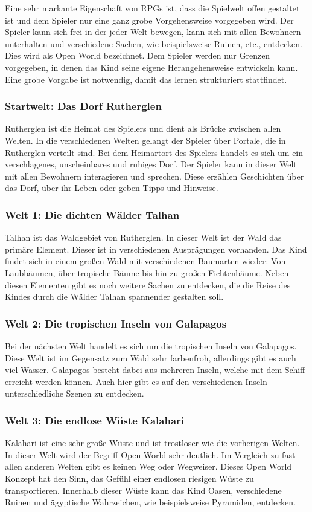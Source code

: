 Eine sehr markante Eigenschaft von \acp{RPG} ist, dass die Spielwelt offen gestaltet ist und dem Spieler nur eine ganz grobe Vorgehensweise vorgegeben wird. Der Spieler kann sich frei in der jeder Welt bewegen, kann sich mit allen Bewohnern unterhalten und verschiedene Sachen, wie beispielsweise Ruinen, etc., entdecken. Dies wird als Open World bezeichnet. Dem Spieler werden nur Grenzen vorgegeben, in denen das Kind seine eigene Herangehensweise entwickeln kann. Eine grobe Vorgabe ist notwendig, damit das lernen strukturiert stattfindet.

\subsubsection{Startwelt: Das Dorf Rutherglen}
	Rutherglen ist die Heimat des Spielers und dient als Brücke zwischen allen Welten. In die verschiedenen Welten gelangt der Spieler über Portale, die in Rutherglen verteilt sind. Bei dem Heimartort des Spielers handelt es sich um ein verschlagenes, unscheinbares und ruhiges Dorf. Der Spieler kann in dieser Welt mit allen Bewohnern interagieren und sprechen. Diese erzählen Geschichten über das Dorf, über ihr Leben oder geben Tipps und Hinweise.
	
\subsubsection{Welt 1: Die dichten Wälder Talhan}
	Talhan ist das Waldgebiet von Rutherglen. In dieser Welt ist der Wald das primäre Element. Dieser ist in verschiedenen Ausprägungen vorhanden. Das Kind findet sich in einem großen Wald mit verschiedenen Baumarten wieder: Von Laubbäumen, über tropische Bäume bis hin zu großen Fichtenbäume. Neben diesen Elementen gibt es noch weitere Sachen zu entdecken, die die Reise des Kindes durch die Wälder Talhan spannender gestalten soll.
	
\subsubsection{Welt 2: Die tropischen Inseln von Galapagos}
	Bei der nächsten Welt handelt es sich um die tropischen Inseln von Galapagos. Diese Welt ist im Gegensatz zum Wald sehr farbenfroh, allerdings gibt es auch viel Wasser. Galapagos besteht dabei aus mehreren Inseln, welche mit dem Schiff erreicht werden können. Auch hier gibt es auf den verschiedenen Inseln unterschiedliche Szenen zu entdecken.
	
\subsubsection{Welt 3: Die endlose Wüste Kalahari}
	Kalahari ist eine sehr große Wüste und ist trostloser wie die vorherigen Welten. In dieser Welt wird der Begriff Open World sehr deutlich. Im Vergleich zu fast allen anderen Welten gibt es keinen Weg oder Wegweiser. Dieses Open World Konzept hat den Sinn, das Gefühl einer endlosen riesigen Wüste zu transportieren. Innerhalb dieser Wüste kann das Kind Oasen, verschiedene Ruinen und ägyptische Wahrzeichen, wie beispielsweise Pyramiden, entdecken.
	
